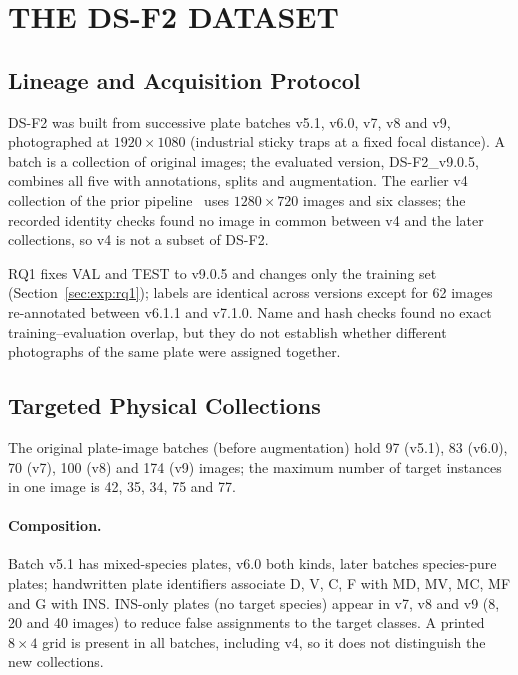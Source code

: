 \section{\uppercase{The DS-F2 Dataset}}
\label{sec:dataset}

\subsection{Lineage and Acquisition Protocol}
\label{sec:dataset:lineage}

DS-F2 was built from successive plate batches v5.1, v6.0, v7, v8 and v9, photographed at $1920\times1080$ (industrial sticky traps at a fixed focal distance). A batch is a collection of original images; the evaluated version, DS-F2\_v9.0.5, combines all five with annotations, splits and augmentation. The earlier v4 collection of the prior pipeline~\cite{pacbb2026} uses $1280\times720$ images and six classes; the recorded identity checks found no image in common between v4 and the later collections, so v4 is not a subset of DS-F2.

RQ1 fixes VAL and TEST to v9.0.5 and changes only the training set (Section~\ref{sec:exp:rq1}); labels are identical across versions except for 62 images re-annotated between v6.1.1 and v7.1.0. Name and hash checks found no exact training--evaluation overlap, but they do not establish whether different photographs of the same plate were assigned together.

\subsection{Targeted Physical Collections}
\label{sec:dataset:collections}

The original plate-image batches (before augmentation) hold 97 (v5.1), 83 (v6.0), 70 (v7), 100 (v8) and 174 (v9) images; the maximum number of target instances in one image is 42, 35, 34, 75 and 77.

\paragraph{Composition.}
Batch v5.1 has mixed-species plates, v6.0 both kinds, later batches species-pure plates; handwritten plate identifiers associate D, V, C, F with MD, MV, MC, MF and G with INS. INS-only plates (no target species) appear in v7, v8 and v9 (8, 20 and 40 images) to reduce false assignments to the target classes. A printed $8\times4$ grid is present in all batches, including v4, so it does not distinguish the new collections.


